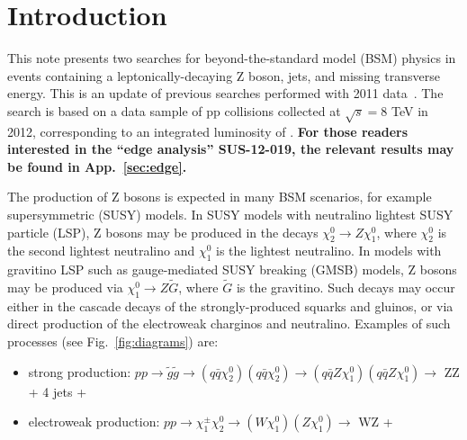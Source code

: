 \section{Introduction}
\label{ref:intro}

This note presents two searches for beyond-the-standard model (BSM) physics in events
containing a leptonically-decaying Z boson, jets, and missing transverse energy. This
is an update of previous searches performed with 2011 data~\cite{ref:Zpaper,ref:EWKPAS}.
The search is based on a data sample of pp collisions collected at $\sqrt{s}=8$ TeV in 2012,
corresponding to an integrated luminosity of \lumi.
{\bf For those readers interested in the ``edge analysis'' SUS-12-019, the relevant results may be found in App.~\ref{sec:edge}.}

The production of Z bosons is expected in many BSM scenarios, for example supersymmetric (SUSY)
models. In SUSY models with neutralino lightest SUSY particle (LSP), Z bosons may be produced in the decays $\chi^0_2\to Z \chi^0_1$,
where $\chi^0_2$ is the second lightest neutralino and $\chi^0_1$ is
the lightest neutralino.
In models with gravitino LSP such as gauge-mediated SUSY breaking (GMSB) models, Z bosons may be produced via
$\chi^0_1\to Z \tilde{G}$, where $\tilde{G}$ is the gravitino. Such decays may occur either in the cascade
decays of the strongly-produced squarks and gluinos, or via direct production of the electroweak
charginos and neutralino. Examples of such processes (see Fig.~\ref{fig:diagrams}) are:

\begin{itemize}
\item strong production:      $pp\to\tilde{g}\tilde{g}\to (q\bar{q}\chi^0_2) (q\bar{q}\chi^0_2)\to(q\bar{q}Z\chi^0_1) (q\bar{q}Z\chi^0_1)\to$ ZZ + 4 jets + \MET
\item electroweak production: $pp\to\chi^\pm_1\chi^0_2\to (W \chi^0_1)(Z \chi^0_1) \to$ WZ + \MET
\end{itemize}

